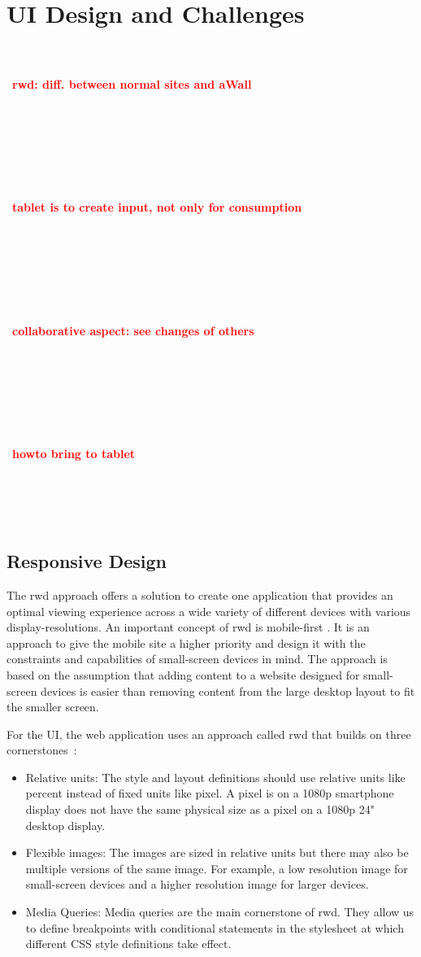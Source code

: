 \documentclass{sigchi}
\newcommand{\todo}[1]{~\\\\~\textbf{\large{\textcolor{red}{#1}}}\\~\\~\\~\\~}
\begin{document}
\section{UI Design and Challenges}

\todo{rwd: diff. between normal sites and aWall}

\todo{tablet is to create input, not only for consumption}

\todo{collaborative aspect: see changes of others}

\todo{howto bring to tablet}


\subsection{Responsive Design}
The \gls{rwd} \cite{Marcotte:2011} approach offers a solution to create one application that provides an optimal viewing experience across a wide variety of different devices with various display-resolutions. 
An important concept of \gls{rwd} is mobile-first \cite{Wroblewski:2011}. 
It is an approach to give the mobile site a higher priority and design it with the constraints and capabilities of small-screen devices in mind. 
The approach is based on the assumption that adding content to a website designed for small-screen devices is easier than removing content from the large desktop layout to fit the smaller screen.


For the UI, the web application uses an approach called \gls{rwd} that builds on three cornerstones~\cite{Marcotte:2011}:
\begin{itemize}
	\item Relative units: The style and layout definitions should use relative units like percent instead of fixed units like pixel. A pixel is on a 1080p smartphone display does not have the same physical size as a pixel on a 1080p 24" desktop display. 
	
	\item Flexible images: The images are sized in relative units but there may also be multiple versions of the same image. For example, a low resolution image for small-screen devices and a higher resolution image for larger devices.
	
	\item Media Queries: Media queries are the main cornerstone of \gls{rwd}. They allow us to define breakpoints with conditional statements in the stylesheet at which different CSS style definitions take effect.
\end{itemize}
\end{document}
